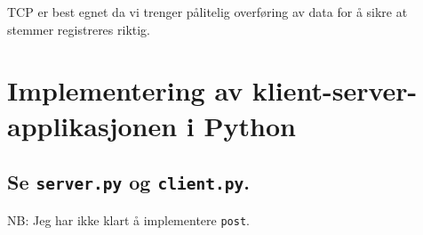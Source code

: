 \documentclass[hidelinks]{article}
\begin{document}
TCP er best egnet da vi trenger pålitelig overføring av data for å sikre at stemmer registreres riktig.

\section{Implementering av klient-server-applikasjonen i Python}

\subsection{Se \texttt{server.py} og \texttt{client.py}.}
NB: Jeg har ikke klart å implementere \texttt{post}.
\end{document}
